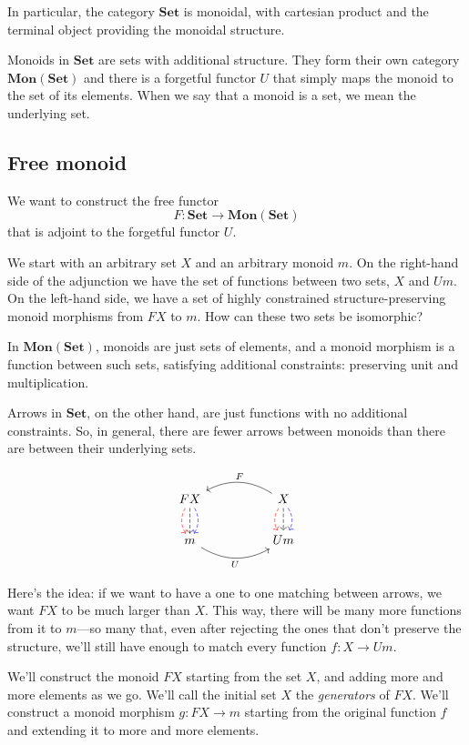 \documentclass[DaoFP]{subfiles}
\begin{document}
In particular, the category $\mathbf{Set}$ is monoidal, with cartesian product and the terminal object providing the monoidal structure. 

Monoids in $\mathbf{Set}$ are sets with additional structure. They form their own category $\mathbf{Mon}(\mathbf{Set})$ and there is a forgetful functor $U$ that simply maps the monoid to the set of its elements. When we say that a monoid is a set, we mean the underlying set.

\subsection{Free monoid}

We want to construct the free functor 
\[ F \colon \mathbf{Set} \to \mathbf{Mon}(\mathbf{Set})\]
that is adjoint to the forgetful functor $U$. 

We start with an arbitrary set $X$ and an arbitrary monoid $m$. On the right-hand side of the adjunction we have the set of functions between two sets, $X$ and $U m$. On the left-hand side, we have a set of highly constrained structure-preserving monoid morphisms from $F X$ to $m$. How can these two sets be isomorphic?

In  $\mathbf{Mon}(\mathbf{Set})$, monoids are just sets of elements, and a monoid morphism is a function between such sets, satisfying additional constraints: preserving unit and multiplication. 

Arrows in $\mathbf{Set}$, on the other hand, are just functions with no additional constraints. So, in general, there are fewer arrows between monoids than there are between their underlying sets. 

\[
 \begin{tikzcd}
F X
\arrow[d, bend right, red, dashed]
\arrow[d, dashed]
\arrow[d, bend left, blue, dashed]
  &&
X
\arrow[d, bend right, red, dashed]
\arrow[d, dashed]
\arrow[d, bend left, blue, dashed]
 \arrow[ll, bend right, "F"']
 \\
m
   \arrow[rr, bend right, "U"']
 &&
 U m
  \end{tikzcd}
\]

Here's the idea: if we want to have a one to one matching between arrows, we want $F X$ to be much larger than $X$. This way, there will be many more functions from it to $m$---so many that, even after rejecting the ones that don't preserve the structure, we'll still have enough to match every function $f \colon X \to U m$.

We'll construct the monoid $F X$ starting from the set $X$, and adding more and more elements as we go. We'll call the initial set $X$ the \emph{generators} of $F X$. We'll construct a monoid morphism $g \colon F X \to m$ starting from the original function $f$ and extending it to more and more elements.
\end{document}
